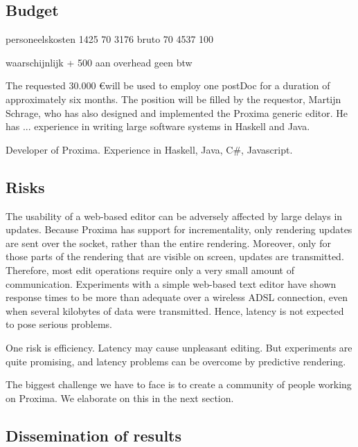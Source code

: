 \documentclass[10pt]{article}
\begin{document}
\subsection{Budget}

\bc
personeelskosten
1425       70%
3176 bruto 70%
4537       100%

waarschijnlijk + 500 aan overhead
geen btw

\ec

The requested 30.000 \euro will be used to employ one postDoc for a duration of approximately six months. The position will be filled by the requestor, Martijn Schrage, who has also designed and implemented the Proxima generic editor. He has ... experience in writing large software systems in Haskell and Java. 

Developer of Proxima. Experience in Haskell, Java, C\#, Javascript.

\subsection{Risks}


The usability of a web-based editor can be adversely affected by large delays in updates. Because Proxima has support for incrementality, only rendering updates are sent over the socket, rather than the entire rendering. Moreover, only for those parts of the rendering that are visible on screen, updates are transmitted. Therefore, most edit operations require only a very small amount of communication. Experiments with a simple web-based text editor have shown response times to be more than adequate over a wireless ADSL connection, even when several kilobytes of data were transmitted. Hence, latency is not expected to pose serious problems. 
 

One risk is efficiency. Latency may cause unpleasant editing. But experiments are quite promising, and latency problems can be overcome by predictive rendering. 




The biggest challenge we have to face is to create a community of people working on Proxima. We elaborate on this in the next section.

\subsection{Dissemination of results}
\end{document}
